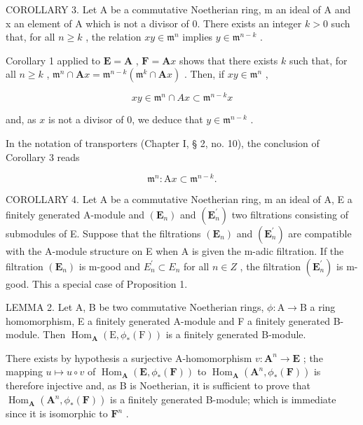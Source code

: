 COROLLARY 3. Let A be a commutative Noetherian ring, m an ideal of A and x an element of A which is not a divisor of 0. There exists an integer \(k > 0\) such that, for all \(n \geqslant k\) , the relation \(xy \in \mathfrak{m}^n\) implies \(y \in \mathfrak{m}^{n - k}\) .

Corollary 1 applied to \(\mathbf{E} = \mathbf{A}\) , \(\mathbf{F} = \mathbf{A}x\) shows that there exists \(k\) such that, for all \(n \geqslant k\) , \(\mathfrak{m}^n \cap \mathbf{A}x = \mathfrak{m}^{n - k}(\mathfrak{m}^k \cap \mathbf{A}x)\) . Then, if \(xy \in \mathfrak{m}^n\) ,

\[
x y \in \mathfrak {m} ^ {n} \cap A x \subset \mathfrak {m} ^ {n - k} x
\]

and, as \(x\) is not a divisor of 0, we deduce that \(y \in \mathfrak{m}^{n - k}\) .

In the notation of transporters (Chapter I, § 2, no. 10), the conclusion of Corollary 3 reads

\[
\mathfrak {m} ^ {n}: \mathrm{A} x \subset \mathfrak {m} ^ {n - k}.\tag{2}
\]

COROLLARY 4. Let A be a commutative Noetherian ring, m an ideal of A, E a finitely generated A-module and \((\mathbf{E}_{n})\) and \((\mathbf{E}_{n}^{\prime})\) two filtrations consisting of submodules of E. Suppose that the filtrations \((\mathbf{E}_{n})\) and \((\mathbf{E}_{n}^{\prime})\) are compatible with the A-module structure on E when A is given the m-adic filtration. If the filtration \((\mathbf{E}_{n})\) is m-good and \(E_{n}^{\prime} \subset E_{n}\) for all \(n \in Z\) , the filtration \((\mathbf{E}_{n}^{\prime})\) is m-good. This a special case of Proposition 1.

LEMMA 2. Let A, B be two commutative Noetherian rings, \(\phi: \mathrm{A} \to \mathrm{B}\) a ring homomorphism, E a finitely generated A-module and F a finitely generated B-module. Then \(\operatorname{Hom}_{\mathbf{A}}(\mathrm{E}, \phi_*(\mathrm{F}))\) is a finitely generated B-module.

There exists by hypothesis a surjective A-homomorphism \(v: \mathbf{A}^n \to \mathbf{E}\) ; the mapping \(u \mapsto u \circ v\) of \(\operatorname{Hom}_{\mathbf{A}}(\mathbf{E}, \phi_*(\mathbf{F}))\) to \(\operatorname{Hom}_{\mathbf{A}}(\mathbf{A}^n, \phi_*(\mathbf{F}))\) is therefore injective and, as B is Noetherian, it is sufficient to prove that \(\operatorname{Hom}_{\mathbf{A}}(\mathbf{A}^n, \phi_*(\mathbf{F}))\) is a finitely generated B-module; which is immediate since it is isomorphic to \(\mathbf{F}^n\) .

